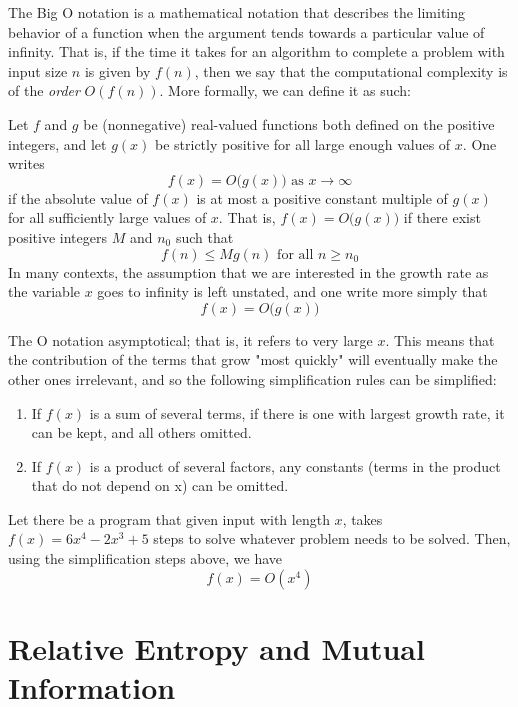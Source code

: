 \documentclass{article}
\begin{document}
  The Big O notation is a mathematical notation that describes the limiting behavior of a function when the argument tends towards a particular value of infinity. That is, if the time it takes for an algorithm to complete a problem with input size $n$ is given by $f(n)$, then we say that the computational complexity is of the \textit{order} $O(f(n))$. More formally, we can define it as such: 

  \begin{definition}
  Let $f$ and $g$ be (nonnegative) real-valued functions both defined on the positive integers, and let $g(x)$ be strictly positive for all large enough values of $x$. One writes
  \[f(x) = O\big( g(x)\big) \text{ as } x \rightarrow \infty\]
  if the absolute value of $f(x)$ is at most a positive constant multiple of $g(x)$ for all sufficiently large values of $x$. That is, $f(x) = O \big(g(x)\big)$ if there exist positive integers $M$ and $n_0$ such that
  \[f(n) \leq M g(n) \text{ for all } n \geq n_0\]
  In many contexts, the assumption that we are interested in the growth rate as the variable $x$ goes to infinity is left unstated, and one write more simply that
  \[f(x) = O\big( g(x)\big)\]
  \end{definition}

  The O notation asymptotical; that is, it refers to very large $x$. This means that the contribution of the terms that grow "most quickly" will eventually make the other ones irrelevant, and so the following simplification rules can be simplified: 
  \begin{enumerate}
      \item If $f(x)$ is a sum of several terms, if there is one with largest growth rate, it can be kept, and all others omitted.
      \item If $f(x)$ is a product of several factors, any constants (terms in the product that do not depend on x) can be omitted.
  \end{enumerate}

  \begin{example}
  Let there be a program that given input with length $x$, takes $f(x) = 6x^4 - 2x^3 + 5$ steps to solve whatever problem needs to be solved. Then, using the simplification steps above, we have 
  \[f(x) = O(x^4)\]
  \end{example}

\section{Relative Entropy and Mutual Information}
\end{document}
